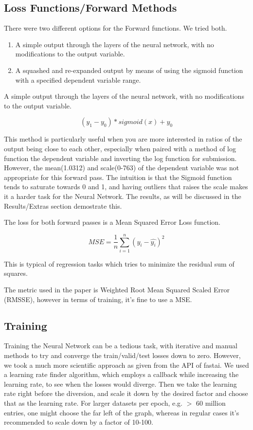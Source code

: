 \documentclass[10pt,twocolumn,letterpaper]{article}
\begin{document}
\subsection{Loss Functions/Forward Methods}
There were two different options for the Forward functions. We tried both.
\begin{enumerate}
  \item A simple output through the layers of the neural network, with no
  modifications to the output variable.
  \item A squashed and re-expanded output by means of using the sigmoid function
  with a specified dependent variable range.
\end{enumerate}
  A simple output through the layers of the neural network, with no
  modifications to the output variable.

\begin{equation}
  (y_1 - y_0) * sigmoid(x) + y_0
  \label{newEqn}
\end{equation}

  This method is particularly useful when you are more interested in ratios of
  the output being close to each other, especially when paired with a method of
  log function the dependent variable and inverting the log function for submission.
  However, the mean(1.0312) and scale(0-763) of the dependent variable was not
  appropriate for this forward pass. The intuition is that the Sigmoid function
  tends to saturate towards 0 and 1, and having outliers that raises the scale
  makes it a harder task for the Neural Network. The results, as will be
  discussed in the Results/Extras section demostrate this.

  The loss for both forward passes is a Mean Squared Error Loss function.

  \begin{equation}
    MSE = \frac{1}{n}\sum_{i=1}^{n} (y_i - \hat{y_i})^2
    \label{newEqn}
  \end{equation}

  This is typical of regression tasks which tries to minimize the residual sum
  of squares.

  The metric used in the paper is Weighted Root Mean Squared Scaled Error
  (RMSSE), however in terms of training, it’s fine to use a MSE.

\subsection{Training}
  Training the Neural Network can be a tedious task, with iterative and manual
  methods to try and converge the train/valid/test losses down to zero. However,
  we took a much more scientific approach as given from the API of fastai. We
  used a learning rate finder algorithm, which employs a callback while
  increasing the learning rate, to see when the losses would diverge. Then we
  take the learning rate right before the diversion, and scale it down by the
  desired factor and choose that as the learning rate. For larger datasets per
  epoch, e.g. $>$ 60 million entries, one might choose the far left of the
  graph, whereas in regular cases it’s recommended to scale down by a factor of
  10-100.
\end{document}
